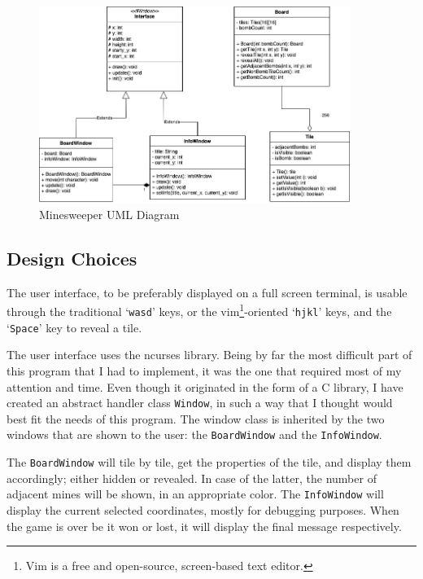 \documentclass{article}
\newcommand{\code}[1]{\texttt{#1}}
\begin{document}
\vspace{6em}
\begin{figure}[h]
	\centering
	\includegraphics[width=0.9\textwidth]{images/minesweeper.png}
	\caption{Minesweeper UML Diagram}
\end{figure}

\newpage

\subsection{Design Choices}

The user interface, to be preferably displayed on a full screen terminal, is
usable through the traditional `\code{wasd}' keys, or the vim\footnote{Vim is a free and open-source, screen-based text editor.}-oriented `\code{hjkl}' keys, and the `\code{Space}'
key to reveal a tile.

The user interface uses the ncurses library. Being by far the most
difficult part of this program that I had to implement, it was the one that required most of 
my attention and time. Even though it originated in the form of a C library, I have created
an abstract handler class \code{Window}, in such a way that I thought would best fit the
needs of this program. The window class is inherited by the two windows that are shown
to the user: the \code{BoardWindow} and the \code{InfoWindow}.

The \code{BoardWindow} will tile by tile, get the properties of the tile, and
display them accordingly; either hidden or revealed. In case of the latter, the number 
of adjacent mines will be shown, in an appropriate color. The \code{InfoWindow} will display the current selected coordinates, mostly for debugging
purposes. When the game is over be it won or lost, it will display the final message respectively.
\end{document}
